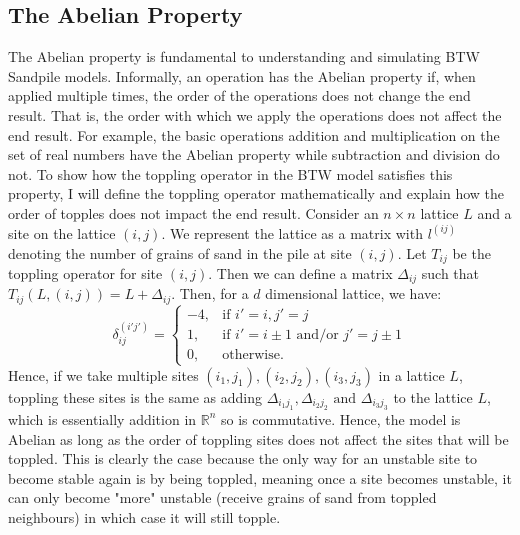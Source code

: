 \documentclass{article}
\begin{document}
\subsection{The Abelian Property}

The Abelian property is fundamental to understanding and simulating BTW Sandpile models. Informally, an operation has the Abelian property if, when applied multiple times, the order of the operations does not change the end result. That is, the order with which we apply the operations does not affect the end result. For example, the basic operations addition and multiplication on the set of real numbers have the Abelian property while subtraction and division do not. To show how the toppling operator in the BTW model satisfies this property, I will define the toppling operator mathematically and explain how the order of topples does not impact the end result.
\newline
Consider an $n\times n$ lattice $L$ and a site on the lattice $(i, j)$. We represent the lattice as a matrix with $l^{(ij)}$ denoting the number of grains of sand in the pile at site $(i, j)$. Let $T_{ij}$ be the toppling operator for site $(i,j)$. Then we can define a matrix $\Delta_{ij}$ such that $T_{ij}(L, (i,j)) = L + \Delta_{ij}$. Then, for a $d$ dimensional lattice, we have:
\[
\delta_{ij}^{(i'j')} = \left\{
\begin{array}{ll}
      -4, & \text{if } i'=i, j'=j \\
      1, & \text{if } i'=i\pm1 \text{ and/or } j'=j\pm1\\ 
      0, & \text{otherwise.}
\end{array} 
\right.
\]
Hence, if we take multiple sites $(i_1,j_1), (i_2, j_2), (i_3, j_3)$ in a lattice $L$, toppling these sites is the same as adding $\Delta_{i_1j_1}, \Delta_{i_2j_2} \text{ and } \Delta_{i_3j_3}$ to the lattice $L$, which is essentially addition in $\mathbb{R}^n$ so is commutative. Hence, the model is Abelian as long as the order of toppling sites does not affect the sites that will be toppled. This is clearly the case because the only way for an unstable site to become stable again is by being toppled, meaning once a site becomes unstable, it can only become "more" unstable (receive grains of sand from toppled neighbours) in which case it will still topple.
\end{document}
